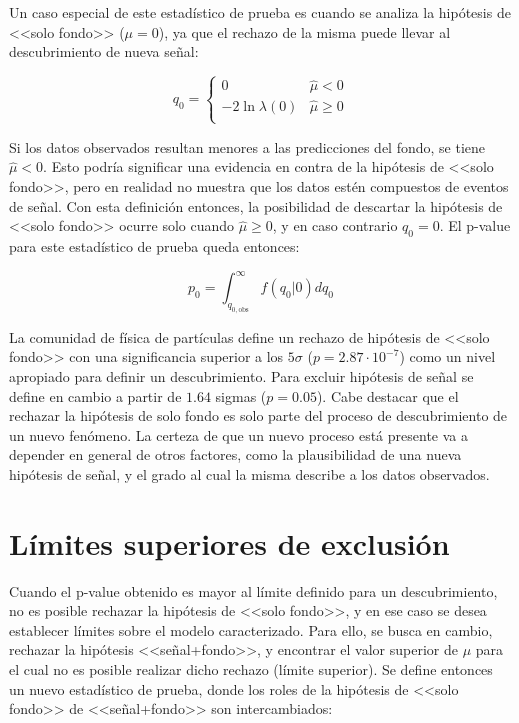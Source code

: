 Un caso especial de este estadístico de prueba es cuando se analiza la hipótesis de <<solo fondo>> ($\mu=0$), ya que el rechazo de la misma puede llevar al descubrimiento de nueva señal:

\begin{equation}
	q_{0}=
	\begin{cases}
		0 & \hat{\mu}<0 \\
		-2\ln{\lambda(0)} & \hat{\mu}\ge0\\
	\end{cases}
	\label{eq:st_q0}
\end{equation}

Si los datos observados resultan menores a las predicciones del fondo, se tiene $\hat{\mu}<0$. Esto podría significar una evidencia en contra de la hipótesis de <<solo fondo>>, pero en realidad no muestra que los datos estén compuestos de eventos de señal. Con esta definición entonces, la posibilidad de descartar la hipótesis de <<solo fondo>> ocurre solo cuando $\hat{\mu}\ge0$, y en caso contrario $q_{0}=0$. El p-value para este estadístico de prueba queda entonces:

\begin{equation}
	p_0 = \int_{q_{0, \text{obs}}}^{\infty} f(q_0|0)dq_0
	\label{ec:pvalue_0}
\end{equation}

La comunidad de física de partículas define un rechazo de hipótesis de <<solo fondo>> con una significancia superior a los $5\sigma$ ($p=2.87 \cdot 10^{-7}$) como un nivel apropiado para definir un descubrimiento. Para excluir hipótesis de señal se define en cambio a partir de $1.64$ sigmas ($p=0.05$). Cabe destacar que el rechazar la hipótesis de solo fondo es solo parte del proceso de descubrimiento de un nuevo fenómeno. La certeza de que un nuevo proceso está presente va a depender en general de otros factores, como la plausibilidad de una nueva hipótesis de señal, y el grado al cual la misma describe a los datos observados.

\section{Límites superiores de exclusión}

Cuando el p-value obtenido es mayor al límite definido para un descubrimiento, no es posible rechazar la hipótesis de <<solo fondo>>, y en ese caso se desea establecer límites sobre el modelo caracterizado. Para ello, se busca en cambio, rechazar la hipótesis <<señal+fondo>>, y encontrar el valor superior de $\mu$ para el cual no es posible realizar dicho rechazo (límite superior). Se define entonces un nuevo estadístico de prueba, donde los roles de la hipótesis de <<solo fondo>> de <<señal+fondo>> son intercambiados:


